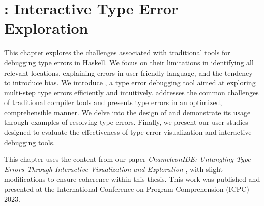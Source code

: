 \graphicspath{{Figures/Chameleon}}

\chapter{\chameleon{}: Interactive Type Error Exploration}


\label{chap:chameleon} 

This chapter explores the challenges associated with traditional tools for debugging type errors in Haskell. We focus on their limitations in identifying all relevant locations, explaining errors in user-friendly language, and the tendency to introduce bias. We introduce \chameleon{}, a type error debugging tool aimed at exploring multi-step type errors efficiently and intuitively. \chameleon{} addresses the common challenges of traditional compiler tools and presents type errors in an optimized, comprehensible manner. We delve into the design of \chameleon{} and demonstrate its usage through examples of resolving type errors. Finally, we present our user studies designed to evaluate the effectiveness of type error visualization and interactive debugging tools.



 This chapter uses the content from our paper \textit{ChameleonIDE: Untangling Type Errors Through Interactive Visualization and
Exploration} \cite{Fu2023-fm}, with slight modifications to ensure coherence within this thesis. This work was published and presented at the International Conference on Program Comprehension (ICPC) 2023.







